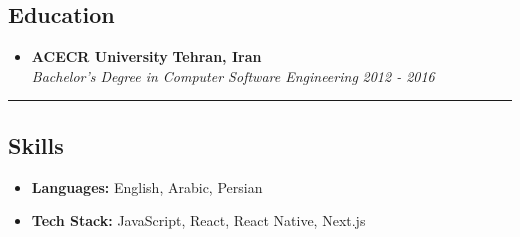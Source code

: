 \documentclass[10pt,letterpaper]{article}
\begin{document}
\subsection*{Education}
  \begin{itemize}
    \parskip=-1em
      \vspace{0.05em}

    \item[]
    {\textbf{ACECR University}}
     \hfill
     \textbf{Tehran, Iran}
    \\
    {\emph{Bachelor’s Degree in Computer Software Engineering}
     \hfill
     \emph{2012 - 2016}}
  \end{itemize}

\hrule
\vspace{-1.0em}
\subsection*{Skills}
\begin{itemize}
  \parskip=-0.5em
  \vspace{0.05em}
  \item[] \textbf{Languages:} English, Arabic, Persian
  \vspace{0.5em}
  \item[] \textbf{Tech Stack:} JavaScript, React, React Native, Next.js
\end{itemize}
\end{document}
